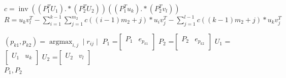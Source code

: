 \documentclass{article}
\begin{document}
\begin{algorithm}[H]
\renewcommand{\thealgorithm}{(TEIM)}
\caption{To obtain the mask function. $r_{ij}$ denotes the $(i,j)$ element of matrix $R$.}\label{alg:TEIM}
\begin{algorithmic}
        \Else
             \State $c=\operatorname{inv}((P_1^TU_1).*(P_2^TU_2))((P_1^Tu_k).*(P_2^Tv_l))$
           \State 
                  $R=u_kv_l^T -\sum_{i=1}^{k-1} \sum_{j=1}^{m_2} c((i-1)m_2+j)*u_iv_j^T
                  -\sum_{j=1}^{l-1} c((k-1)m_2+j)*u_kv_j^T$

           \State $(p_{k1},p_{k2})=\operatorname{argmax}_{i,j} \mid r_{ij} \mid$
           \State $P_1$ =$\begin{bmatrix}
                        P_1 & e_{p_{k1}}\\
                    \end{bmatrix} $
           \State $P_2$ =$\begin{bmatrix}
                        P_2 & e_{p_{k2}}\\
                    \end{bmatrix} $
             \State $U_1$ =$\begin{bmatrix}
                    U_1 & u_{k}\\
                    \end{bmatrix} $
           \State $U_2$ =$\begin{bmatrix}
                        U_2 & v_{l}\\
                    \end{bmatrix} $
        \EndIf
    \EndFor
\EndFor \\
\Return $P_1,P_2$
\end{algorithmic}
\end{algorithm}
\end{document}
